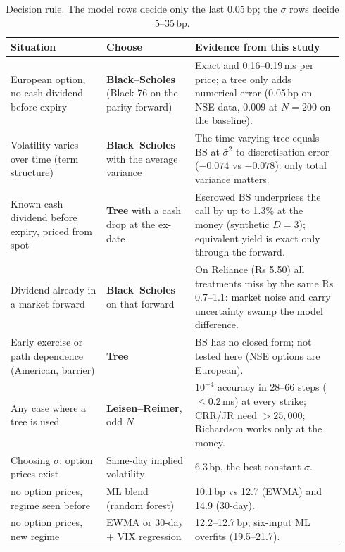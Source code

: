 \documentclass[10pt,a4paper]{article}
\begin{document}
\begin{table}[H]
\raggedright\small
\begin{tabular}{@{}p{0.27\linewidth}p{0.25\linewidth}p{0.42\linewidth}@{}}
\toprule
Situation & Choose & Evidence from this study\\
\midrule
European option, no cash dividend before expiry & \textbf{Black--Scholes} (Black-76 on the parity forward) & Exact and
0.16--0.19\,ms per price; a tree only adds numerical error (0.05\,bp on NSE data, 0.009 at $N=200$ on the baseline).\\
Volatility varies over time (term structure) & \textbf{Black--Scholes} with the average variance & The time-varying
tree equals BS at $\bar\sigma^2$ to discretisation error ($-0.074$ vs $-0.078$): only total variance matters.\\
Known cash dividend before expiry, priced from spot & \textbf{Tree} with a cash drop at the ex-date & Escrowed BS
underprices the call by up to 1.3\% at the money (synthetic $D=3$); equivalent yield is exact only through the
forward.\\
Dividend already in a market forward & \textbf{Black--Scholes} on that forward & On Reliance (Rs 5.50) all
treatments miss by the same Rs 0.7--1.1: market noise and carry uncertainty swamp the model difference.\\
\raggedright Early exercise or path dependence (American, barrier) & \textbf{Tree} & BS has no closed form; not tested here (NSE
options are European).\\
Any case where a tree is used & \textbf{Leisen--Reimer}, odd $N$ & $10^{-4}$ accuracy in 28--66 steps ($\le0.2$\,ms) at
every strike; CRR/JR need $>25{,}000$; Richardson works only at the money.\\
\midrule
Choosing $\sigma$: option prices exist & Same-day implied volatility & 6.3\,bp, the best constant $\sigma$.\\
\quad no option prices, regime seen before & ML blend (random forest) & 10.1\,bp vs 12.7 (EWMA) and 14.9 (30-day).\\
\quad no option prices, new regime & EWMA or 30-day + VIX regression & 12.2--12.7\,bp; six-input ML overfits (19.5--21.7).\\
\bottomrule
\end{tabular}
\caption{Decision rule. The model rows decide only the last 0.05\,bp; the $\sigma$ rows decide 5--35\,bp.}\label{tab:rule}
\vspace{-8pt}
\end{table}
\end{document}
